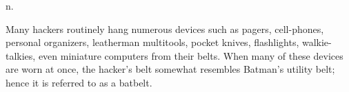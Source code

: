  n.

Many hackers routinely hang numerous devices such as pagers, cell-phones,
personal organizers, leatherman multitools, pocket knives, flashlights,
walkie-talkies, even miniature computers from their belts. When many of these
devices are worn at once, the hacker's belt somewhat resembles Batman's utility
belt; hence it is referred to as a batbelt.


